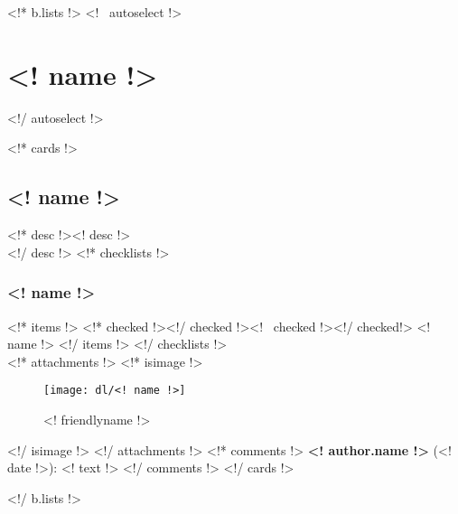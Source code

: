



\renewcommand{\chaptertitle}{FTC - 4290 - "High PHidelity"}
\renewcommand{\today}{FTC Notebook 2014-2015}
\renewcommand{\sectiontitle}{Revision 4/9/2015 16:42}

\setcounter{chapter}{1}
\setcounter{page}{1}
\renewcommand\contentsname{Table of Contents}
\setcounter{tocdepth}{2}
\renewcommand{\sectiontitle}{Table of Contents}
\tableofcontents
\renewcommand{\thesection}{}
\clearpage



<!* b.lists !>
<!~ autoselect !>\section{<! name !>}<!/ autoselect !>

<!* cards !>
\subsection{<! name !>}
<!* desc !><! desc !>\\<!/ desc !>
<!* checklists !>
\subsubsection{<! name !>}
<!* items !>
<!* checked !>\boxchecked<!/ checked !><!~ checked !>\boxunchecked<!/ checked!> <! name !>
<!/ items !>
<!/ checklists !>\mbox{}\\

<!* attachments !>
<!* isimage !>
\begin{figure}
  \centering
  \texttt{[image: dl/<! name !>]}
  \caption[]{<! friendlyname !>}
  \label{fig:<! name !>}
\end{figure}
<!/ isimage !>
<!/ attachments !>
<!* comments !>
{\bf <! author.name !>} {\color{darkgray} (<! date !>)}: <! text !>
<!/ comments !>
<!/ cards !>

<!/ b.lists !>

